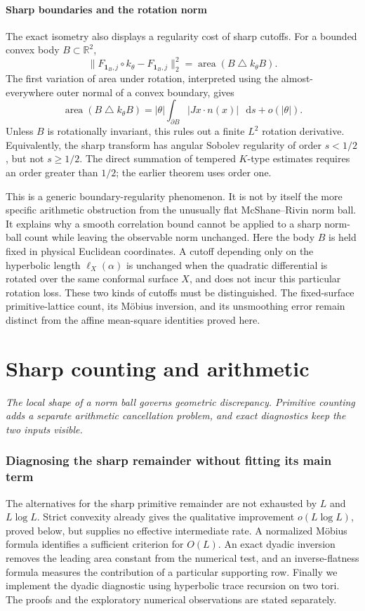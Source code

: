 \documentclass[11pt,a4paper]{article}
\newcommand{\monographpart}[2]{%
  \clearpage\part{#1}%
  \noindent\textit{#2}\par\medskip}
\numberwithin{equation}{section}
\theoremstyle{definition}
\theoremstyle{remark}
\newcommand{\dd}{\mathop{}\!\mathrm d}
\newcommand{\RR}{\mathbb R}
\begin{document}
\subsection{Sharp boundaries and the rotation norm}
\label{subsec:affinesharprotation}

The exact isometry also displays a regularity cost of sharp cutoffs.
For a bounded convex body $B\subset\RR^2$,
\[
 \|F_{\mathbf1_B,j}\circ k_\theta-F_{\mathbf1_B,j}\|_2^2
 =\operatorname{area}(B\mathbin\triangle k_\theta B).
\]
The first variation of area under rotation, interpreted using the
almost-everywhere outer normal of a convex boundary, gives
\[
 \operatorname{area}(B\mathbin\triangle k_\theta B)
 =|\theta|\int_{\partial B}|Jx\cdot n(x)|\,\dd s+o(|\theta|).
\]
Unless $B$ is rotationally invariant, this rules out a finite
$L^2$ rotation derivative. Equivalently, the sharp transform has
angular Sobolev regularity of order $s<1/2$, but not $s\geq1/2$.
The direct summation of tempered $K$-type estimates requires an
order greater than $1/2$; the earlier theorem uses order one.

This is a generic boundary-regularity phenomenon. It is not by
itself the more specific arithmetic obstruction from the unusually
flat McShane--Rivin norm ball. It explains why a smooth correlation
bound cannot be applied to a sharp norm-ball count while leaving
the observable norm unchanged. Here the body $B$ is held fixed in
physical Euclidean coordinates. A cutoff depending only on the
hyperbolic length $\ell_X(\alpha)$ is unchanged when the quadratic
differential is rotated over the same conformal surface $X$, and
does not incur this particular rotation loss. These two kinds of
cutoffs must be distinguished. The fixed-surface primitive-lattice
count, its M\"obius inversion, and its unsmoothing error remain
distinct from the affine mean-square identities proved here.




\monographpart{Sharp counting and arithmetic}{The local shape of a norm ball governs geometric discrepancy. Primitive counting adds a separate arithmetic cancellation problem, and exact diagnostics keep the two inputs visible.}

\section{Diagnosing the sharp remainder without fitting its main term}
\label{sec:sharpdiagnostics}

The alternatives for the sharp primitive remainder are not exhausted by
$L$ and $L\log L$. Strict convexity already gives the qualitative
improvement $o(L\log L)$, proved below, but supplies no effective
intermediate rate. A normalized M\"obius formula identifies a sufficient
criterion for $O(L)$. An exact dyadic inversion removes the leading area
constant from the numerical test, and an inverse-flatness formula measures
the contribution of a particular supporting row. Finally we implement the
dyadic diagnostic using hyperbolic trace recursion on two tori.
The proofs and the exploratory numerical observations are stated separately.
\end{document}
